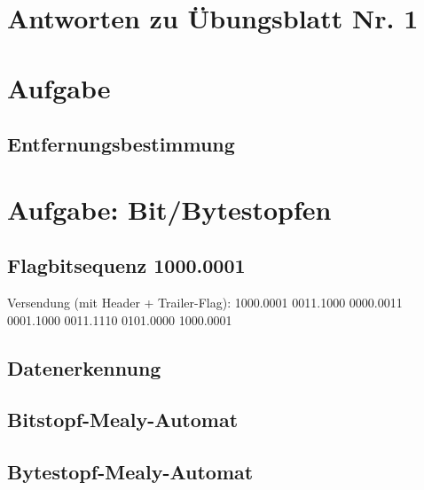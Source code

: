 \documentclass{scrartcl}
\begin{document}
\section*{Antworten zu Übungsblatt Nr. 1}

\section{Aufgabe}

\subsection{Entfernungsbestimmung}



\section{Aufgabe: Bit/Bytestopfen}

\subsection{Flagbitsequenz 1000.0001}
Versendung (mit Header + Trailer-Flag): 1000.0001 0011.1000 0000.0011 0001.1000 0011.1110 0101.0000 1000.0001

\subsection{Datenerkennung}

\subsection{Bitstopf-Mealy-Automat}
\subsection{Bytestopf-Mealy-Automat}
\end{document}
